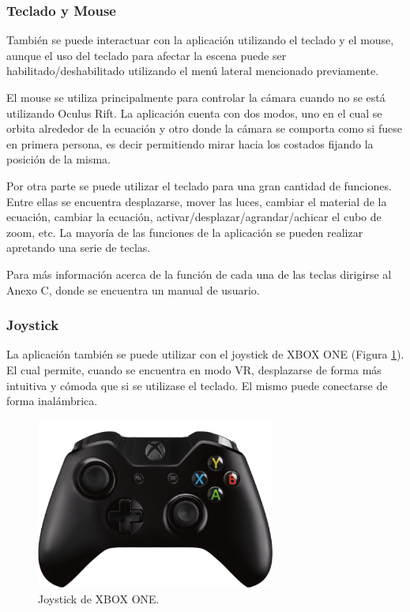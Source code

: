 \documentclass[12pt]{article}
\begin{document}
\subsubsection{Teclado y Mouse}
También se puede interactuar con la aplicación utilizando el teclado y el mouse, aunque el uso del teclado para afectar la escena puede ser habilitado/deshabilitado utilizando el menú lateral mencionado previamente.

El mouse se utiliza principalmente para controlar la cámara cuando no se está utilizando Oculus Rift. La aplicación cuenta con dos modos, uno en el cual se orbita alrededor de la ecuación y otro donde la cámara se comporta como si fuese en primera persona, es decir permitiendo mirar hacia los costados fijando la posición de la misma.

Por otra parte se puede utilizar el teclado para una gran cantidad de funciones. Entre ellas se encuentra desplazarse, mover las luces, cambiar el material de la ecuación, cambiar la ecuación, activar/desplazar/agrandar/achicar el cubo de zoom, etc. La mayoría de las funciones de la aplicación se pueden realizar apretando una serie de teclas.

Para más información acerca de la función de cada una de las teclas dirigirse al Anexo C, donde se encuentra un manual de usuario.
\clearpage
\subsubsection{Joystick}
La aplicación también se puede utilizar con el joystick de XBOX ONE (Figura \ref{xbox}). El cual permite, cuando se encuentra en modo VR, desplazarse de forma más intuitiva y cómoda que si se utilizase el teclado. El mismo puede conectarse de forma inalámbrica.\\
\begin{figure}[h!]
\includegraphics[width=0.7\textwidth,center]{joystickPosta.png}
\caption{Joystick de XBOX ONE.}
\label{xbox}
\end{figure}
\end{document}
